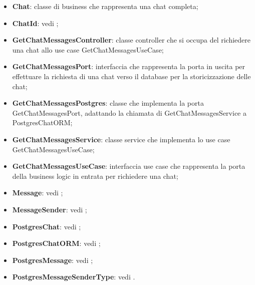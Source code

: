 \documentclass[10pt, a4paper]{article}
\begin{document}
\begin{itemize}
    \item \label{Chat}\textbf{Chat}: classe di business che rappresenta una chat completa;
    \item \textbf{ChatId}: vedi ;
    \item \label{GetChatMessagesController}\textbf{GetChatMessagesController}: classe controller che si occupa del richiedere una chat allo use case GetChatMessagesUseCase;
    \item \label{GetChatMessagesPort}\textbf{GetChatMessagesPort}: interfaccia che rappresenta la porta in uscita per effettuare la richiesta di una chat verso il database per la storicizzazione delle chat;
    \item \label{GetChatMessagesPostgres}\textbf{GetChatMessagesPostgres}: classe che implementa la porta GetChatMessagesPort, adattando la chiamata di GetChatMessagesService a PostgresChatORM;
    \item \label{GetChatMessagesService}\textbf{GetChatMessagesService}: classe service che implementa lo use case GetChatMessagesUseCase;
    \item \label{GetChatMessagesUseCase}\textbf{GetChatMessagesUseCase}: interfaccia use case che rappresenta la porta della business logic in entrata per richiedere una chat;
    \item \textbf{Message}: vedi ;
    \item \textbf{MessageSender}: vedi ;
    \item \textbf{PostgresChat}: vedi ;
    \item \textbf{PostgresChatORM}: vedi ;
    \item \textbf{PostgresMessage}: vedi ;
    \item \textbf{PostgresMessageSenderType}: vedi .
\end{itemize}






    
    
    
   
    
\end{document}
